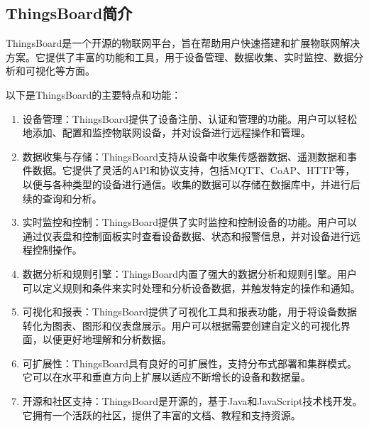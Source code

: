 \documentclass[a4paper,12pt,english]{sphinxmanual}
\begin{document}
{{\sphinxAtStartPar
{}


\subsection{ThingsBoard简介}
\label{\detokenize{exp-esp32/iot-cloud:thingsboard}}
\sphinxAtStartPar
ThingsBoard是一个开源的物联网平台，旨在帮助用户快速搭建和扩展物联网解决方案。它提供了丰富的功能和工具，用于设备管理、数据收集、实时监控、数据分析和可视化等方面。

\sphinxAtStartPar
以下是ThingsBoard的主要特点和功能：
\begin{enumerate}
%
\item {} 
\sphinxAtStartPar
设备管理：ThingsBoard提供了设备注册、认证和管理的功能。用户可以轻松地添加、配置和监控物联网设备，并对设备进行远程操作和管理。

\item {} 
\sphinxAtStartPar
数据收集与存储：ThingsBoard支持从设备中收集传感器数据、遥测数据和事件数据。它提供了灵活的API和协议支持，包括MQTT、CoAP、HTTP等，以便与各种类型的设备进行通信。收集的数据可以存储在数据库中，并进行后续的查询和分析。

\item {} 
\sphinxAtStartPar
实时监控和控制：ThingsBoard提供了实时监控和控制设备的功能。用户可以通过仪表盘和控制面板实时查看设备数据、状态和报警信息，并对设备进行远程控制操作。

\item {} 
\sphinxAtStartPar
数据分析和规则引擎：ThingsBoard内置了强大的数据分析和规则引擎。用户可以定义规则和条件来实时处理和分析设备数据，并触发特定的操作和通知。

\item {} 
\sphinxAtStartPar
可视化和报表：ThingsBoard提供了可视化工具和报表功能，用于将设备数据转化为图表、图形和仪表盘展示。用户可以根据需要创建自定义的可视化界面，以便更好地理解和分析数据。

\item {} 
\sphinxAtStartPar
可扩展性：ThingsBoard具有良好的可扩展性，支持分布式部署和集群模式。它可以在水平和垂直方向上扩展以适应不断增长的设备和数据量。

\item {} 
\sphinxAtStartPar
开源和社区支持：ThingsBoard是开源的，基于Java和JavaScript技术栈开发。它拥有一个活跃的社区，提供了丰富的文档、教程和支持资源。

\end{enumerate}

}}
\end{document}
